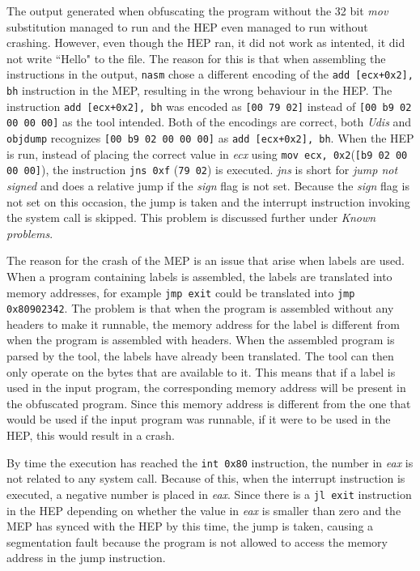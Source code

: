 \documentclass[11pt,twoside]{eitExjobb}
\begin{document}
The output generated when obfuscating the program without the 32 bit \emph{mov} substitution managed to run and the HEP even managed to run without crashing. However, even though the HEP ran, it did not work as intented, it did not write ``Hello" to the file. The reason for this is that when assembling the instructions in the output, \texttt{nasm} chose a different encoding of the \texttt{add [ecx+0x2], bh} instruction in the MEP, resulting in the wrong behaviour in the HEP. The instruction \texttt{add [ecx+0x2], bh} was encoded as \texttt{[00 79 02]} instead of \texttt{[00 b9 02 00 00 00]} as the tool intended. Both of the encodings are correct, both \emph{Udis} and \texttt{objdump} recognizes \texttt{[00 b9 02 00 00 00]} as \texttt{add [ecx+0x2], bh}. When the HEP is run, instead of placing the correct value in \emph{ecx} using \texttt{mov ecx, 0x2}(\texttt{[b9 02 00 00 00]}),  the instruction \texttt{jns 0xf} (\texttt{79 02}) is executed. \emph{jns} is short for \emph{jump not signed} and does a relative jump if the \emph{sign} flag is not set. Because the \emph{sign} flag is not set on this occasion, the jump is taken and the interrupt instruction invoking the system call is skipped. This problem is discussed further under \emph{Known problems}.

The reason for the crash of the MEP is an issue that arise when labels are used. When a program containing labels is assembled, the labels are translated into memory addresses, for example \texttt{jmp exit} could be translated into \texttt{jmp 0x80902342}. The problem is that when the program is assembled without any headers to make it runnable, the memory address for the label is different from when the program is assembled with headers. When the assembled program is parsed by the tool, the labels have already been translated. The tool can then only operate on the bytes that are available to it. This means that if a label is used in the input program, the corresponding memory address will be present in the obfuscated program. Since this memory address is different from the one that would be used if the input program was runnable, if it were to be used in the HEP, this would result in a crash. 

By time the execution has reached the \texttt{int 0x80} instruction, the number in \emph{eax} is not related to any system call. Because of this, when the interrupt instruction is executed, a negative number is placed in \emph{eax}. Since there is a \texttt{jl exit} instruction in the HEP depending on whether the value in \emph{eax} is smaller than zero and the MEP has synced with the HEP by this time, the jump is taken, causing a segmentation fault because the program is not allowed to access the memory address in the jump instruction. 
\end{document}
